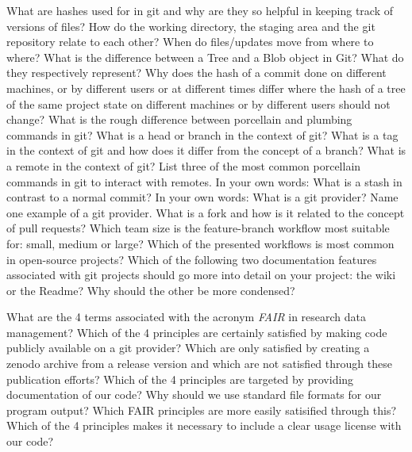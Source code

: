 \documentclass[]{erlangen-problemset}
\begin{document}
\begin{problem}[title={Version control with git}]
\noindent
\Question What are hashes used for in git and why are they so helpful in keeping track of versions of files?
\Question How do the working directory, the staging area and the git repository relate to each other? When do files/updates move from where to where?
\Question What is the difference between a Tree and a Blob object in Git? What do they respectively represent?
\Question Why does the hash of a commit done on different machines, or by different users or at different times differ where the hash of a tree of the same project state on different machines or by different users should not change?
\Question What is the rough difference between porcellain and plumbing commands in git?
\Question What is a head or branch in the context of git?
\Question What is a tag in the context of git and how does it differ from the concept of a branch?
\Question What is a remote in the context of git? List three of the most common porcellain commands in git to interact with remotes.
\Question In your own words: What is a stash in contrast to a normal commit?
\Question In your own words: What is a git provider? Name one example of a git provider.
\Question What is a fork and how is it related to the concept of pull requests?
\Question Which team size is the feature-branch workflow most suitable for: small, medium or large?
\Question Which of the presented workflows is most common in open-source projects?
\Question Which of the following two documentation features associated with git projects should go more into detail on your project: the wiki or the Readme? Why should the other be more condensed?
\end{problem}

\begin{problem}[title={FAIR research data management}]
\noindent
\Question What are the 4 terms associated with the acronym \emph{FAIR} in research data management?
\Question Which of the 4 principles are certainly satisfied by making code publicly available on a git provider? Which are only satisfied by creating a zenodo archive from a release version and which are not satisfied through these publication efforts?
\Question Which of the 4 principles are targeted by providing documentation of our code?
\Question Why should we use standard file formats for our program output? Which FAIR principles are more easily satisified through this?
\Question Which of the 4 principles makes it necessary to include a clear usage license with our code?
\end{problem}
\end{document}
